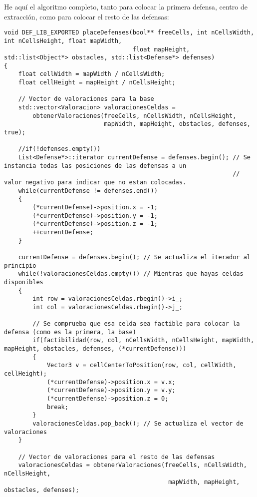 He aquí el algoritmo completo, tanto para colocar la primera defensa,
centro de extracción, como para colocar el resto de las defensas:

\lstset{language=C++, texcl=true}
\begin{lstlisting}[frame=single]
void DEF_LIB_EXPORTED placeDefenses(bool** freeCells, int nCellsWidth, int nCellsHeight, float mapWidth,
                                    float mapHeight, std::list<Object*> obstacles, std::list<Defense*> defenses)
{
    float cellWidth = mapWidth / nCellsWidth;
    float cellHeight = mapHeight / nCellsHeight;

    // Vector de valoraciones para la base
    std::vector<Valoracion> valoracionesCeldas =
        obtenerValoraciones(freeCells, nCellsWidth, nCellsHeight,
                            mapWidth, mapHeight, obstacles, defenses, true);

    //if(!defenses.empty())
    List<Defense*>::iterator currentDefense = defenses.begin(); // Se instancia todas las posiciones de las defensas a un
                                                                // valor negativo para indicar que no estan colocadas.
    while(currentDefense != defenses.end())
    {
        (*currentDefense)->position.x = -1;
        (*currentDefense)->position.y = -1;
        (*currentDefense)->position.z = -1;
        ++currentDefense;
    }

    currentDefense = defenses.begin(); // Se actualiza el iterador al principio
    while(!valoracionesCeldas.empty()) // Mientras que hayas celdas disponibles
    {
        int row = valoracionesCeldas.rbegin()->i_;
        int col = valoracionesCeldas.rbegin()->j_;

        // Se comprueba que esa celda sea factible para colocar la defensa (como es la primera, la base)
        if(factibilidad(row, col, nCellsWidth, nCellsHeight, mapWidth, mapHeight, obstacles, defenses, (*currentDefense)))
        {
            Vector3 v = cellCenterToPosition(row, col, cellWidth, cellHeight);
            (*currentDefense)->position.x = v.x;
            (*currentDefense)->position.y = v.y;
            (*currentDefense)->position.z = 0;
            break;
        }
        valoracionesCeldas.pop_back(); // Se actualiza el vector de valoraciones
    }

    // Vector de valoraciones para el resto de las defensas
    valoracionesCeldas = obtenerValoraciones(freeCells, nCellsWidth, nCellsHeight,
                                              mapWidth, mapHeight, obstacles, defenses);


\end{lstlisting}
